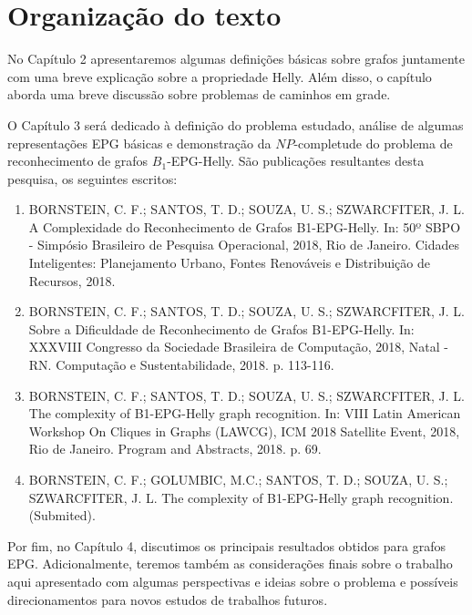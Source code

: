 





\section{Organização do texto}

No Capítulo 2 apresentaremos algumas definições básicas sobre grafos juntamente com uma breve explicação sobre a propriedade Helly. Além disso, o capítulo aborda uma breve discussão sobre problemas de caminhos em grade.

O Capítulo 3 será dedicado à definição do problema estudado, análise de algumas representações EPG básicas e demonstração da $NP$-completude do problema de reconhecimento de grafos $B_1$-EPG-Helly. São publicações resultantes desta pesquisa, os seguintes escritos:

\begin{enumerate}
    \item BORNSTEIN, C. F.; SANTOS, T. D.; SOUZA, U. S.; SZWARCFITER, J. L. A Complexidade do Reconhecimento de Grafos B1-EPG-Helly. In: 50º SBPO - Simpósio Brasileiro de Pesquisa Operacional, 2018, Rio de Janeiro. Cidades Inteligentes: Planejamento Urbano, Fontes Renováveis e Distribuição de Recursos, 2018.

     \item BORNSTEIN, C. F.; SANTOS, T. D.; SOUZA, U. S.; SZWARCFITER, J. L. Sobre a Dificuldade de Reconhecimento de Grafos B1-EPG-Helly. In: XXXVIII Congresso da Sociedade Brasileira de Computação, 2018, Natal - RN. Computação e Sustentabilidade, 2018. p. 113-116.

     
     \item BORNSTEIN, C. F.; SANTOS, T. D.; SOUZA, U. S.; SZWARCFITER, J. L. The complexity of B1-EPG-Helly graph recognition. In: VIII Latin American Workshop On Cliques in Graphs (LAWCG), ICM 2018 Satellite Event, 2018, Rio de Janeiro. Program and Abstracts, 2018. p. 69.

     
     \item BORNSTEIN, C. F.; GOLUMBIC, M.C.; SANTOS, T. D.; SOUZA, U. S.; SZWARCFITER, J. L.  The complexity of B1-EPG-Helly graph recognition. %
     (Submited).
     
\end{enumerate}


Por fim, no Capítulo 4, discutimos os principais resultados obtidos para grafos EPG. Adicionalmente, teremos
também as considerações finais sobre o trabalho aqui apresentado com algumas perspectivas e ideias sobre o problema e possíveis direcionamentos para novos estudos de trabalhos futuros.